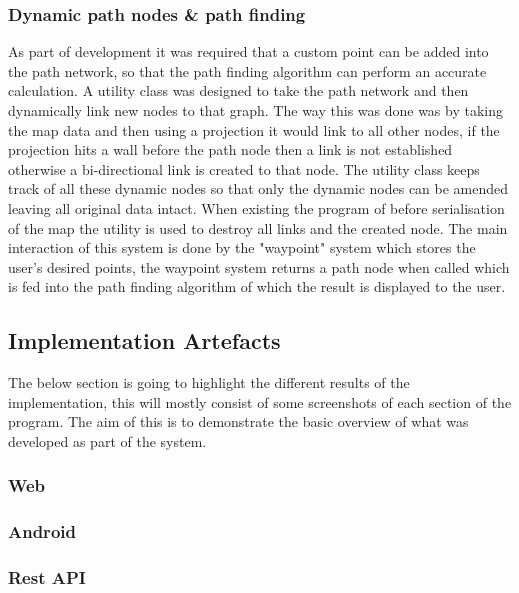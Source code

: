 \subsubsection{Dynamic path nodes \& path finding}
As part of development it was required that a custom point can be added into the path network, so that the path finding algorithm can perform an accurate calculation. A utility class was designed to take the path network and then dynamically link new nodes to that graph. The way this was done was by taking the map data and then using a projection it would link to all other nodes, if the projection hits a wall before the path node then a link is not established otherwise a bi-directional link is created to that node. The utility class keeps track of all these dynamic nodes so that only the dynamic nodes can be amended leaving all original data intact. When existing the program of before serialisation of the map the utility is used to destroy all links and the created node. The main interaction of this system is done by the "waypoint" system which stores the user's desired points, the waypoint system returns a path node when called which is fed into the path finding algorithm of which the result is displayed to the user.


\subsection{Implementation Artefacts}
The below section is going to highlight the different results of the implementation, this will mostly consist of some screenshots of each section of the program. The aim of this is to demonstrate the basic overview of what was developed as part of the system.

\subsubsection{Web}
\subsubsection{Android}
\subsubsection{Rest API}


